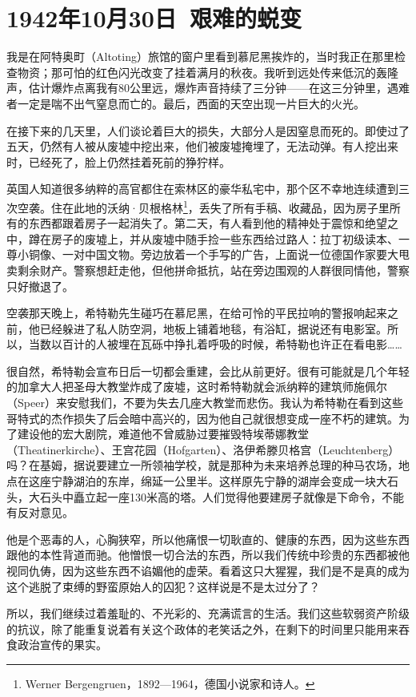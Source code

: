 \documentclass[UTF8]{ctexart}
\begin{document}
\section{1942年10月30日\ 艰难的蜕变}

我是在阿特奥町（Altoting）旅馆的窗户里看到慕尼黑挨炸的，当时我正在那里检查物资；那可怕的红色闪光改变了挂着满月的秋夜。我听到远处传来低沉的轰隆声，估计爆炸点离我有80公里远，爆炸声音持续了三分钟——在这三分钟里，遇难者一定是喘不出气窒息而亡的。最后，西面的天空出现一片巨大的火光。

在接下来的几天里，人们谈论着巨大的损失，大部分人是因窒息而死的。即使过了五天，仍然有人被从废墟中挖出来，他们被废墟掩埋了，无法动弹。有人挖出来时，已经死了，脸上仍然挂着死前的狰狞样。

英国人知道很多纳粹的高官都住在索林区的豪华私宅中，那个区不幸地连续遭到三次空袭。住在此地的沃纳·贝根格林\footnote{Werner Bergengruen，1892—1964，德国小说家和诗人。}，丢失了所有手稿、收藏品，因为房子里所有的东西都跟着房子一起消失了。第二天，有人看到他的精神处于震惊和绝望之中，蹲在房子的废墟上，并从废墟中随手捡一些东西给过路人：拉丁初级读本、一尊小铜像、一对中国文物。旁边放着一个手写的广告，上面说一位德国作家要大甩卖剩余财产。警察想赶走他，但他拼命抵抗，站在旁边围观的人群很同情他，警察只好撤退了。

空袭那天晚上，希特勒先生碰巧在慕尼黑，在给可怜的平民拉响的警报响起来之前，他已经躲进了私人防空洞，地板上铺着地毯，有浴缸，据说还有电影室。所以，当数以百计的人被埋在瓦砾中挣扎着呼吸的时候，希特勒也许正在看电影……

很自然，希特勒会宣布日后一切都会重建，会比从前更好。很有可能就是几个年轻的加拿大人把圣母大教堂炸成了废墟，这时希特勒就会派纳粹的建筑师施佩尔（Speer）来安慰我们，不要为失去几座大教堂而悲伤。我认为希特勒在看到这些哥特式的杰作损失了后会暗中高兴的，因为他自己就很想变成一座不朽的建筑。为了建设他的宏大剧院，难道他不曾威胁过要摧毁特埃蒂娜教堂（Theatinerkirche）、王宫花园（Hofgarten）、洛伊希滕贝格宫（Leuchtenberg）吗？在基姆，据说要建立一所领袖学校，就是那种为未来培养总理的种马农场，地点在这座宁静湖泊的东岸，绵延一公里半。这样原先宁静的湖岸会变成一块大石头，大石头中矗立起一座130米高的塔。人们觉得他要建房子就像是下命令，不能有反对意见。

他是个恶毒的人，心胸狭窄，所以他痛恨一切耿直的、健康的东西，因为这些东西跟他的本性背道而驰。他憎恨一切合法的东西，所以我们传统中珍贵的东西都被他视同仇俦，因为这些东西不谄媚他的虚荣。看着这只大猩猩，我们是不是真的成为这个逃脱了束缚的野蛮原始人的囚犯？这样说是不是太过分了？

所以，我们继续过着羞耻的、不光彩的、充满谎言的生活。我们这些软弱资产阶级的抗议，除了能重复说着有关这个政体的老笑话之外，在剩下的时间里只能用来吞食政治宣传的果实。
\end{document}
